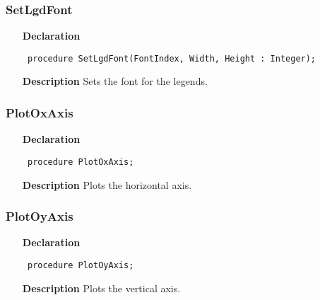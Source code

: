\documentclass[12pt,a4paper,oneside]{report}
\newcommand{\declarationitem}[1]{\textbf{#1}}
\newcommand{\descriptiontitle}[1]{\textbf{#1}}
\newcommand{\code}[1]{\texttt{#1}}
\begin{document}
\subsubsection{SetLgdFont}
\label{uplot-SetLgdFont}
\begin{itemize}\item[\declarationitem{Declaration}\hfill]
	\begin{flushleft}
		\code{
			procedure SetLgdFont(FontIndex, Width, Height : Integer);}
		
	\end{flushleft}
	
	\par
	\item[\descriptiontitle{Description}]
	Sets the font for the legends.
	
\end{itemize}
\subsubsection{PlotOxAxis}
\label{uplot-PlotOxAxis}
\begin{itemize}\item[\declarationitem{Declaration}\hfill]
	\begin{flushleft}
		\code{
			procedure PlotOxAxis;}
		
	\end{flushleft}
	
	\par
	\item[\descriptiontitle{Description}]
	Plots the horizontal axis.
	
\end{itemize}
\subsubsection{PlotOyAxis}
\label{uplot-PlotOyAxis}
\begin{itemize}\item[\declarationitem{Declaration}\hfill]
	\begin{flushleft}
		\code{
			procedure PlotOyAxis;}
		
	\end{flushleft}
	
	\par
	\item[\descriptiontitle{Description}]
	Plots the vertical axis.
	
\end{itemize}
\end{document}
